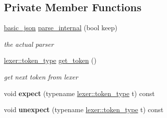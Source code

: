 \subsection*{Private Member Functions}
\begin{DoxyCompactItemize}
\item 
\hyperlink{classnlohmann_1_1basic__json}{basic\+\_\+json} \hyperlink{classnlohmann_1_1basic__json_1_1parser_a2c3d3e70491f1ab4ec1697ea12be5df3}{parse\+\_\+internal} (bool keep)
\begin{DoxyCompactList}\small\item\em the actual parser \end{DoxyCompactList}\item 
\hyperlink{classnlohmann_1_1basic__json_1_1lexer_a96887d6cd131e3d3a85a9d71fbdbcdf7}{lexer\+::token\+\_\+type} \hyperlink{classnlohmann_1_1basic__json_1_1parser_a08a66112d6e23b7a66a0a3a0a4dd5fed}{get\+\_\+token} ()
\begin{DoxyCompactList}\small\item\em get next token from lexer \end{DoxyCompactList}\item 
\hypertarget{classnlohmann_1_1basic__json_1_1parser_a272f32f161b2637fabe9932453e699c7}{}void {\bfseries expect} (typename \hyperlink{classnlohmann_1_1basic__json_1_1lexer_a96887d6cd131e3d3a85a9d71fbdbcdf7}{lexer\+::token\+\_\+type} t) const \label{classnlohmann_1_1basic__json_1_1parser_a272f32f161b2637fabe9932453e699c7}

\item 
\hypertarget{classnlohmann_1_1basic__json_1_1parser_a6d3870ee78ced4ff6c5b8b89a207a356}{}void {\bfseries unexpect} (typename \hyperlink{classnlohmann_1_1basic__json_1_1lexer_a96887d6cd131e3d3a85a9d71fbdbcdf7}{lexer\+::token\+\_\+type} t) const \label{classnlohmann_1_1basic__json_1_1parser_a6d3870ee78ced4ff6c5b8b89a207a356}

\end{DoxyCompactItemize}
